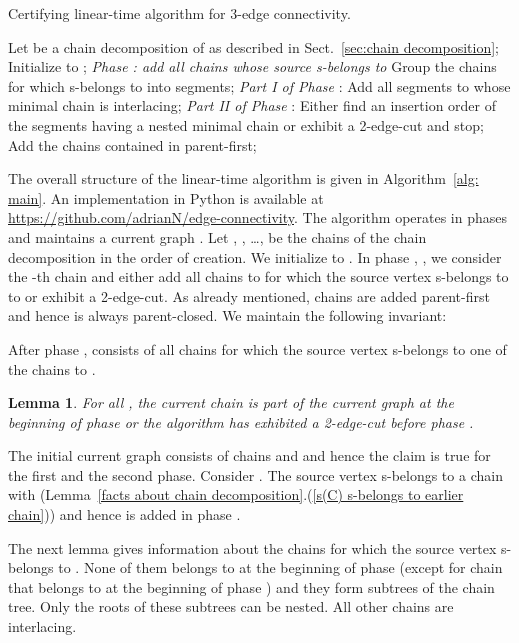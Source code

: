 \documentclass[paper=a4]{scrartcl}
\newtheorem{lemma}{Lemma}
\newcommand{\qed}{}
\newcommand{\mqed}{\hfill}
\newlength{\proofpostskipamount}\newlength{\proofpreskipamount}
\newenvironment{proof}{\par\vspace{\proofpreskipamount}\noindent{\textbf{Proof:}}\hspace{0.5em}}{\nopagebreak \strut\nopagebreak \hspace{\fill}\mqed\par\vspace{\proofpostskipamount}\noindent}
\begin{document}
\begin{algorithm}[t]
\caption{Certifying linear-time algorithm for 3-edge connectivity.}\label{alg: main}
\begin{algorithmic}
\State Let  be a chain decomposition of  as
described in Sect.~\ref{sec:chain decomposition};
\State Initialize  to ;
             \Comment \emph{Phase : add all chains whose source s-belongs to }
	\State Group the chains  for which  s-belongs to  into
        segments;
\State \emph{Part I of Phase }: Add all segments to  whose minimal chain is interlacing;
	\State \emph{Part II of Phase }: Either find an insertion order  of the segments having a nested minimal chain or exhibit a 2-edge-cut and stop;
		\State Add the chains contained in  parent-first;
	\EndFor
\EndFor
\EndProcedure
\end{algorithmic}
\end{algorithm}

The overall structure of the linear-time algorithm is given in Algorithm~\ref{alg: main}. An implementation in Python is available at \url{https://github.com/adrianN/edge-connectivity}. The algorithm operates in phases and maintains a current graph . Let , , \ldots,  be the chains of the chain decomposition in the order of creation. We initialize  to . In phase , , we consider the -th chain  and either add all chains  to  for which the source vertex  s-belongs to  to  or exhibit a 2-edge-cut. As already mentioned, chains are added parent-first and hence  is always parent-closed. We maintain the following invariant:\smallskip

 After phase ,  consists of all chains for which the source vertex s-belongs to one of the chains  to .

\begin{lemma}\label{prop:ci_already_added}
For all , the current chain  is part of the current graph  at the beginning of phase  or the algorithm has exhibited a 2-edge-cut before phase .
\end{lemma}
\begin{proof}
The initial current graph consists of chains  and  and hence the claim is true for the first and the second phase. Consider . The source vertex  s-belongs to a chain  with  (Lemma~\ref{facts about chain decomposition}.(\ref{s(C) s-belongs to earlier chain})) and hence  is added in phase . \qed
\end{proof}

The next lemma gives information about the chains for which the source vertex s-belongs to . None of them belongs to  at the beginning of phase  (except for chain  that belongs to  at the beginning of phase ) and they form subtrees of the chain tree. Only the roots of these subtrees can be nested. All other chains are interlacing.
\end{document}
